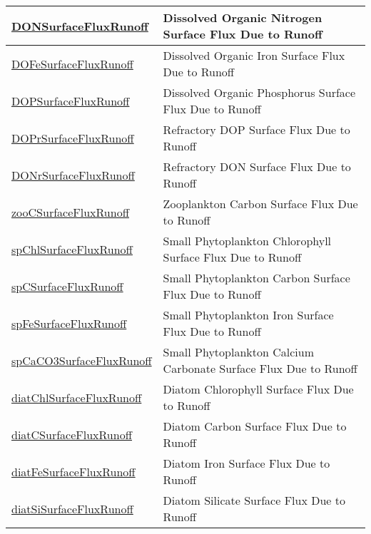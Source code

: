 {\begin{center}
\begin{longtable}{| p{2.0in} | p{4.0in} |}
    \hline
    \hyperref[subsec:var_sec_forcing_DONSurfaceFluxRunoff]{DONSurfaceFluxRunoff} & Dissolved Organic Nitrogen Surface Flux Due to Runoff \\
    \hline
    \hyperref[subsec:var_sec_forcing_DOFeSurfaceFluxRunoff]{DOFeSurfaceFluxRunoff} & Dissolved Organic Iron Surface Flux Due to Runoff \\
    \hline
    \hyperref[subsec:var_sec_forcing_DOPSurfaceFluxRunoff]{DOPSurfaceFluxRunoff} & Dissolved Organic Phosphorus Surface Flux Due to Runoff \\
    \hline
    \hyperref[subsec:var_sec_forcing_DOPrSurfaceFluxRunoff]{DOPrSurfaceFluxRunoff} & Refractory DOP Surface Flux Due to Runoff \\
    \hline
    \hyperref[subsec:var_sec_forcing_DONrSurfaceFluxRunoff]{DONrSurfaceFluxRunoff} & Refractory DON Surface Flux Due to Runoff \\
    \hline
    \hyperref[subsec:var_sec_forcing_zooCSurfaceFluxRunoff]{zooCSurfaceFluxRunoff} & Zooplankton Carbon Surface Flux Due to Runoff \\
    \hline
    \hyperref[subsec:var_sec_forcing_spChlSurfaceFluxRunoff]{spChlSurfaceFluxRunoff} & Small Phytoplankton Chlorophyll Surface Flux Due to Runoff \\
    \hline
    \hyperref[subsec:var_sec_forcing_spCSurfaceFluxRunoff]{spCSurfaceFluxRunoff} & Small Phytoplankton Carbon Surface Flux Due to Runoff \\
    \hline
    \hyperref[subsec:var_sec_forcing_spFeSurfaceFluxRunoff]{spFeSurfaceFluxRunoff} & Small Phytoplankton Iron Surface Flux Due to Runoff \\
    \hline
    \hyperref[subsec:var_sec_forcing_spCaCO3SurfaceFluxRunoff]{spCaCO3SurfaceFluxRunoff} & Small Phytoplankton Calcium Carbonate Surface Flux Due to Runoff \\
    \hline
    \hyperref[subsec:var_sec_forcing_diatChlSurfaceFluxRunoff]{diatChlSurfaceFluxRunoff} & Diatom Chlorophyll Surface Flux Due to Runoff \\
    \hline
    \hyperref[subsec:var_sec_forcing_diatCSurfaceFluxRunoff]{diatCSurfaceFluxRunoff} & Diatom Carbon Surface Flux Due to Runoff \\
    \hline
    \hyperref[subsec:var_sec_forcing_diatFeSurfaceFluxRunoff]{diatFeSurfaceFluxRunoff} & Diatom Iron Surface Flux Due to Runoff \\
    \hline
    \hyperref[subsec:var_sec_forcing_diatSiSurfaceFluxRunoff]{diatSiSurfaceFluxRunoff} & Diatom Silicate Surface Flux Due to Runoff \\

\end{longtable}
\end{center}}
